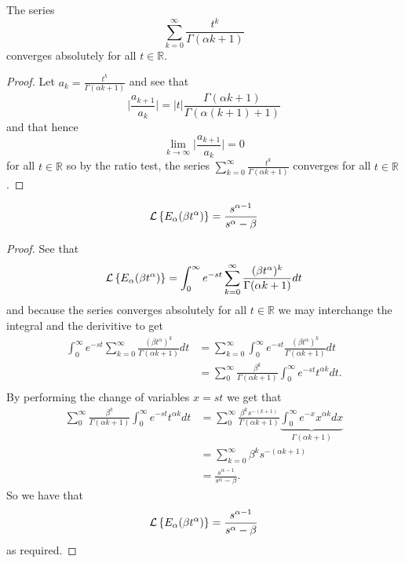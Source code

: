 \documentclass{article}
\begin{document}
\begin{lemma}
	The series
	$$
		\sum_{k=0}^{\infty} \frac{t^k}{\Gamma(\alpha k + 1)} 
	$$
  	converges absolutely for all $ t \in \mathbb{R} $.
\end{lemma}
\begin{proof}
	Let $ a_k = \frac{t^k}{\Gamma(\alpha k + 1) }$ and see that
	$$ \lvert \frac{a_{k+1}}{a_k} \rvert = |t| \frac{\Gamma(\alpha k + 1) }{\Gamma(\alpha(k+1) + 1)} $$
	and that hence 
	$$
		\lim_{k \longrightarrow \infty} \lvert \frac{a_{k+1}}{a_k} \rvert = 0
	$$
	for all $ t \in \mathbb{R} $ so by the ratio test, the series $ \sum_{k=0}^{\infty} \frac{t^k}{\Gamma(\alpha k + 1)}  $
	converges for all $ t \in \mathbb{R} $.
\end{proof}
\begin{lemma}
	\begin{align*}	
		\mathcal{L} \left\{  E_\alpha (\beta t^\alpha) \right\} = \frac{s^{\alpha - 1}}{s^\alpha - \beta}
	\end{align*}
\end{lemma}
\begin{proof}
	See that
	\begin{align*}
		\mathcal{L} \left\{  E_\alpha (\beta t^\alpha) \right\} = \int_0^\infty e^{-st} \sum_{k=0}^\infty \frac{(\beta t^\alpha)^k}{\Gamma(\alpha k+1)} dt
	\end{align*}
	and because the series converges absolutely for all $ t \in \mathbb{R} $ we may interchange the integral
	and the derivitive to get
	\begin{align*}
		\int_0^\infty e^{-st} \sum_{k=0}^\infty \frac{(\beta t^\alpha)^k}{\Gamma(\alpha k+1)} dt &= \sum_{k=0}^\infty \int_0^\infty e^{-st} \frac{(\beta t^\alpha)^k}{\Gamma(\alpha k + 1)} dt \\
			&= \sum_0^\infty \frac{\beta^k}{\Gamma(\alpha k + 1)} \int_0^\infty e^{-st} t^{\alpha k} dt. \\
	\end{align*}
	By performing the change of variables $ x =st $ we get that 
	\begin{align*}
		\sum_0^\infty \frac{\beta^k}{\Gamma(\alpha k + 1)} \int_0^\infty e^{-st} t^{\alpha k} dt 
			&= \sum_0^\infty \frac{\beta^k s^{-(k+1)}}{\Gamma(\alpha k + 1)} \underbrace{\int_0^\infty e^{-x} x^{\alpha k} dx}_{\Gamma(\alpha k + 1)} \\
			&= \sum_{k=0}^\infty \beta^{k} s^{-(\alpha k + 1)} \\
			&= \frac{s^{\alpha-1}}{s^\alpha - \beta}.		
	\end{align*}
	So we have that 
	\begin{align*}	
		\mathcal{L} \left\{  E_\alpha (\beta t^\alpha) \right\} = \frac{s^{\alpha - 1}}{s^\alpha - \beta}
	\end{align*}	
	as required.
\end{proof}


\end{document}
